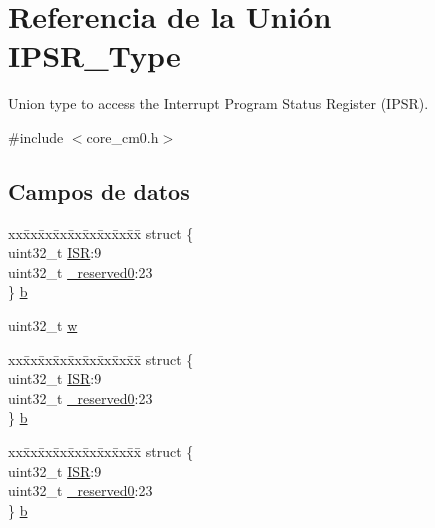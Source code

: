 \hypertarget{union_i_p_s_r___type}{}\section{Referencia de la Unión I\+P\+S\+R\+\_\+\+Type}
\label{union_i_p_s_r___type}


Union type to access the Interrupt Program Status Register (I\+P\+SR).  




{\ttfamily \#include $<$core\+\_\+cm0.\+h$>$}

\subsection*{Campos de datos}
\begin{DoxyCompactItemize}
\item 
\begin{tabbing}
xx\=xx\=xx\=xx\=xx\=xx\=xx\=xx\=xx\=\kill
struct \{\\
\>uint32\_t \hyperlink{union_i_p_s_r___type_ad502ba7dbb2aab5f87c782b28f02622d}{ISR}:9\\
\>uint32\_t \hyperlink{union_i_p_s_r___type_ac8a6a13838a897c8d0b8bc991bbaf7c1}{\_reserved0}:23\\
\} \hyperlink{union_i_p_s_r___type_a3758147356a15906221a5625a27d9048}{b}\\

\end{tabbing}\item 
uint32\+\_\+t \hyperlink{union_i_p_s_r___type_ad0fb62e7a08e70fc5e0a76b67809f84b}{w}
\item 
\begin{tabbing}
xx\=xx\=xx\=xx\=xx\=xx\=xx\=xx\=xx\=\kill
struct \{\\
\>uint32\_t \hyperlink{union_i_p_s_r___type_ad502ba7dbb2aab5f87c782b28f02622d}{ISR}:9\\
\>uint32\_t \hyperlink{union_i_p_s_r___type_ac8a6a13838a897c8d0b8bc991bbaf7c1}{\_reserved0}:23\\
\} \hyperlink{union_i_p_s_r___type_ac4b1360265e95e8f834ee8f804b83f3a}{b}\\

\end{tabbing}\item 
\begin{tabbing}
xx\=xx\=xx\=xx\=xx\=xx\=xx\=xx\=xx\=\kill
struct \{\\
\>uint32\_t \hyperlink{union_i_p_s_r___type_ad502ba7dbb2aab5f87c782b28f02622d}{ISR}:9\\
\>uint32\_t \hyperlink{union_i_p_s_r___type_ac8a6a13838a897c8d0b8bc991bbaf7c1}{\_reserved0}:23\\
\} \hyperlink{union_i_p_s_r___type_a7f652697aca4eb51fd5a75cd894a13c7}{b}\\


\end{tabbing}
\end{DoxyCompactItemize}
